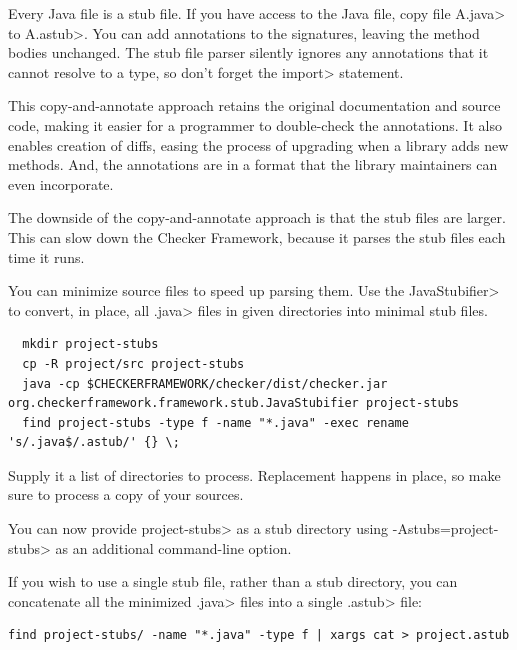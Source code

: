 


Every Java file is a stub file.  If you have access to the Java file,
copy file \<A.java> to \<A.astub>.  You can add
annotations to the signatures, leaving the method bodies unchanged.
The stub file parser silently ignores any annotations that it cannot
resolve to a type, so don't forget the \<import> statement.

This copy-and-annotate approach retains the original
documentation and source code, making it easier for a programmer to
double-check the annotations.  It also enables creation of diffs, easing
the process of upgrading when a library adds new methods.  And, the
annotations are in a format that the library maintainers can even
incorporate.

The downside of the copy-and-annotate approach is that the stub files are
larger.  This can
slow down the Checker Framework, because it parses the stub files each time
it runs.

You can minimize source files to speed up parsing them.
Use the \<JavaStubifier> to convert, in place, all \<.java> files in given directories into
minimal stub files.

\begin{Verbatim}
  mkdir project-stubs
  cp -R project/src project-stubs
  java -cp $CHECKERFRAMEWORK/checker/dist/checker.jar org.checkerframework.framework.stub.JavaStubifier project-stubs
  find project-stubs -type f -name "*.java" -exec rename 's/.java$/.astub/' {} \;
\end{Verbatim}

Supply it a list of directories to process. Replacement happens in place, so make sure to
process a copy of your sources.

You can now provide \<project-stubs> as a stub directory using \<-Astubs=project-stubs> as
an additional command-line option.

If you wish to use a single stub file, rather than a stub directory,
you can concatenate all the minimized \<.java> files into a single \<.astub> file:

\begin{Verbatim}
find project-stubs/ -name "*.java" -type f | xargs cat > project.astub
\end{Verbatim}

